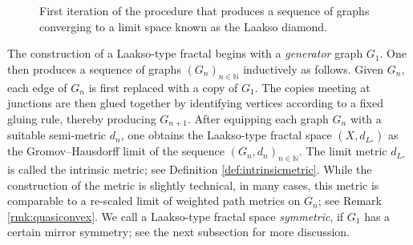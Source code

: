 \documentclass{amsart}
\numberwithin{equation}{section}
\theoremstyle{definition}
\theoremstyle{remark}
\newcommand{\N}{\mathbb{N}}
\begin{document}
\begin{figure}[!ht]
\begin{tikzpicture}[scale=1.3]
















\end{tikzpicture}
    \caption{First iteration of the procedure that produces a sequence of graphs converging to a limit space known as the Laakso diamond.}
    \label{Figure: Construction of Laakso Diamond}
    \end{figure}

The construction of a Laakso-type fractal begins with a \emph{generator} graph \(G_1\). One then produces a sequence of graphs \((G_n)_{n\in\N}\) inductively as follows. Given \(G_n\), each edge of \(G_n\) is first replaced with a copy of \(G_1\). The copies meeting at junctions are then glued together by identifying vertices according to a fixed gluing rule, thereby producing \(G_{n+1}\). After equipping each graph \(G_n\) with a suitable semi-metric \(d_n\), one obtains the Laakso-type fractal space \((X,d_{L_*})\) as the Gromov–Hausdorff limit of the sequence \((G_n, d_n)_{n\in\N}\). The limit metric \(d_{L_*}\) is called the intrinsic metric; see Definition \ref{def:intrinsicmetric}. While the construction of the metric is slightly technical, in many cases, this metric is comparable to a re-scaled limit of weighted path metrics on $G_n$; see Remark \ref{rmk:quasiconvex}. We call a Laakso-type fractal space \emph{symmetric}, if $G_1$ has a certain mirror symmetry; see the next subsection for more discussion. 
\end{document}
